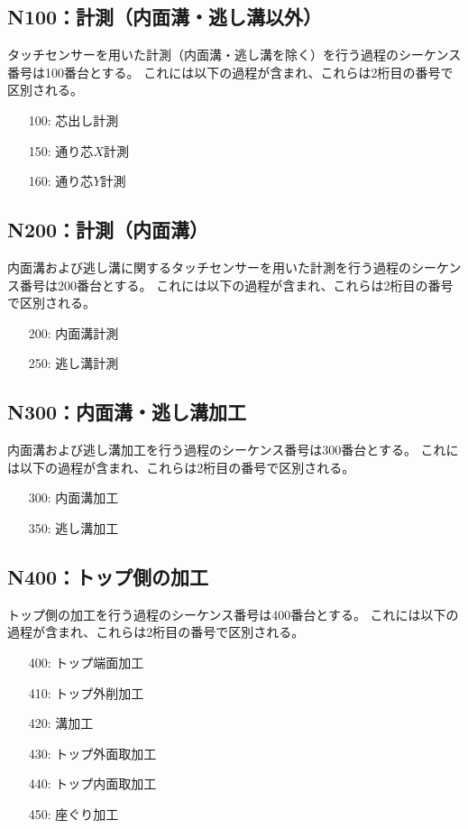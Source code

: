 \subsection{N100：計測（内面溝・逃し溝以外）}
タッチセンサーを用いた計測（内面溝・逃し溝を除く）を行う過程のシーケンス番号は100番台とする。
これには以下の過程が含まれ、これらは2桁目の番号で区別される。
\begin{enumerate}
\item[100:] 芯出し計測
\item[150:] 通り芯$X$計測
\item[160:] 通り芯$Y$計測
\end{enumerate}


\subsection{N200：計測（内面溝）}
内面溝および逃し溝に関するタッチセンサーを用いた計測を行う過程のシーケンス番号は200番台とする。
これには以下の過程が含まれ、これらは2桁目の番号で区別される。
\begin{enumerate}
\item[200:] 内面溝計測
\item[250:] 逃し溝計測
\end{enumerate}


\subsection{N300：内面溝・逃し溝加工}
内面溝および逃し溝加工を行う過程のシーケンス番号は300番台とする。
これには以下の過程が含まれ、これらは2桁目の番号で区別される。
\begin{enumerate}
\item[300:] 内面溝加工
\item[350:] 逃し溝加工
\end{enumerate}


\subsection{N400：トップ側の加工}
トップ側の加工を行う過程のシーケンス番号は400番台とする。
これには以下の過程が含まれ、これらは2桁目の番号で区別される。
\begin{enumerate}
\item[400:] トップ端面加工
\item[410:] トップ外削加工
\item[420:] 溝加工
\item[430:] トップ外面取加工
\item[440:] トップ内面取加工
\item[450:] 座ぐり加工
\end{enumerate}


